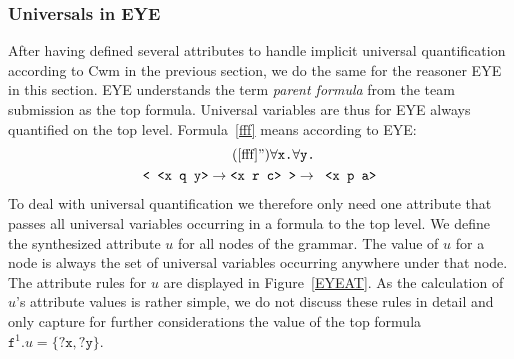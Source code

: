 \subsubsection{Universals in EYE}
After having defined several attributes to handle implicit universal quantification according to Cwm in the previous section, 
we do the same for the reasoner
EYE in this section. EYE understands the term \emph{parent formula} from the \wwwc team submission 
as the top formula.
Universal variables are thus for EYE always quantified on the top level. Formula~\ref{fff} means according to EYE:
\begin{multline}\tag{\ref{fff}''}\label{fff'}
  \forall \texttt{x.}\forall\texttt{y.}\\
 \texttt{< <x q y>} \rightarrow \texttt{<x r c> >}\rightarrow\texttt{ <x p a>}
\end{multline}
To deal with universal quantification we therefore only need one attribute that passes all universal variables occurring in a formula to the top level.
We define the synthesized attribute $u$ for all nodes of the grammar. %
The value of $u$ for a node is always the set of universal variables occurring anywhere under that node. %
The attribute rules for $u$ are displayed in Figure~\ref{EYEAT}. As the calculation of $u$'s attribute values is rather simple, 
we do not discuss these rules in detail and only capture for further considerations the value of the top formula  $\texttt{f}^1.u=\{\texttt{?x}, \texttt{?y}\}$.
